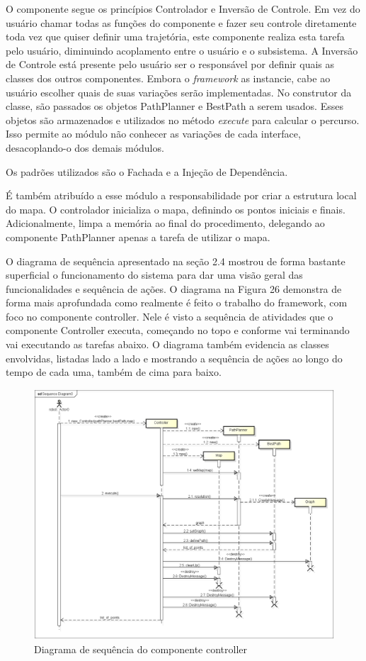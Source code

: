 O componente segue os princípios Controlador e Inversão de Controle. Em vez do usuário chamar todas as funções do componente e fazer seu controle diretamente toda vez que quiser definir uma trajetória, este componente realiza esta tarefa pelo usuário, diminuindo acoplamento entre o usuário e o subsistema. A Inversão de Controle está presente pelo usuário ser o responsável por definir quais as classes dos outros componentes. Embora o \textit{framework} as instancie, cabe ao usuário escolher quais de suas variações serão implementadas. No construtor da classe, são passados os objetos PathPlanner e BestPath a serem usados. Esses objetos são armazenados e utilizados no método \textit{execute} para calcular o percurso. Isso permite ao módulo não conhecer as variações de cada interface, desacoplando-o dos demais módulos.

Os padrões utilizados são o Fachada e a Injeção de Dependência.

É também atribuído a esse módulo a responsabilidade por criar a estrutura local do mapa. O controlador inicializa o mapa, definindo os pontos iniciais e finais. Adicionalmente, limpa a memória ao final do procedimento, delegando ao componente PathPlanner apenas a tarefa de utilizar o mapa.

O diagrama de sequência apresentado na seção 2.4 mostrou de forma bastante superficial o funcionamento do sistema para dar uma visão geral das funcionalidades e sequência de ações. O diagrama na Figura 26 demonstra de forma mais aprofundada como realmente é feito o trabalho do framework, com foco no componente controller. Nele é visto a sequência de atividades que o componente Controller executa, começando no topo e conforme vai terminando vai executando as tarefas abaixo. O diagrama também evidencia as classes envolvidas, listadas lado a lado e mostrando a sequência de ações ao longo do tempo de cada uma, também de cima para baixo.

\begin{figure}[h]
	\centering
	\label{fig26}
		\includegraphics[keepaspectratio=true,scale=0.4]{figuras/executeController.png}
	\caption{Diagrama de sequência do componente controller}
\end{figure}

